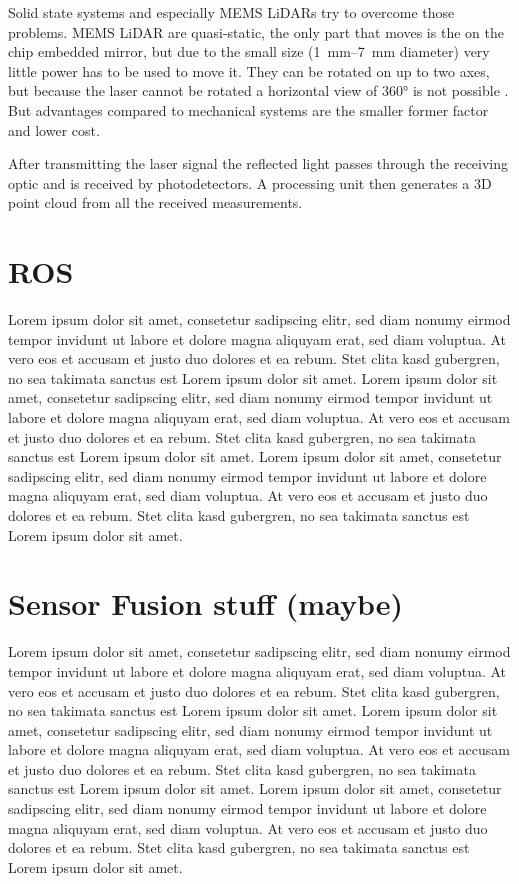 Solid state systems and especially MEMS LiDARs try to overcome those problems.
MEMS LiDAR are quasi-static, the only part that moves is the on the chip embedded mirror, but due to the small size (\SIrange{1}{7}{\milli\metre} diameter) very little power has to be used to move it.
They can be rotated on up to two axes, but because the laser cannot be rotated a horizontal view of 360° is not possible .
But advantages compared to mechanical systems are the smaller former factor and lower cost.

After transmitting the laser signal the reflected light passes through the receiving optic and is received by photodetectors.
A processing unit then generates a 3D point cloud from all the received measurements.

\cite{Wang2020}
\cite{Vaughan2006}

\section{ROS}
Lorem ipsum dolor sit amet, consetetur sadipscing elitr, sed diam nonumy eirmod tempor invidunt ut labore et dolore magna aliquyam erat, sed diam voluptua.
At vero eos et accusam et justo duo dolores et ea rebum. Stet clita kasd gubergren, no sea takimata sanctus est Lorem ipsum dolor sit amet.
Lorem ipsum dolor sit amet, consetetur sadipscing elitr, sed diam nonumy eirmod tempor invidunt ut labore et dolore magna aliquyam erat, sed diam voluptua.
At vero eos et accusam et justo duo dolores et ea rebum. Stet clita kasd gubergren, no sea takimata sanctus est Lorem ipsum dolor sit amet.
Lorem ipsum dolor sit amet, consetetur sadipscing elitr, sed diam nonumy eirmod tempor invidunt ut labore et dolore magna aliquyam erat, sed diam voluptua.
At vero eos et accusam et justo duo dolores et ea rebum. Stet clita kasd gubergren, no sea takimata sanctus est Lorem ipsum dolor sit amet.

\section{Sensor Fusion stuff (maybe)}
Lorem ipsum dolor sit amet, consetetur sadipscing elitr, sed diam nonumy eirmod tempor invidunt ut labore et dolore magna aliquyam erat, sed diam voluptua.
At vero eos et accusam et justo duo dolores et ea rebum. Stet clita kasd gubergren, no sea takimata sanctus est Lorem ipsum dolor sit amet.
Lorem ipsum dolor sit amet, consetetur sadipscing elitr, sed diam nonumy eirmod tempor invidunt ut labore et dolore magna aliquyam erat, sed diam voluptua.
At vero eos et accusam et justo duo dolores et ea rebum. Stet clita kasd gubergren, no sea takimata sanctus est Lorem ipsum dolor sit amet.
Lorem ipsum dolor sit amet, consetetur sadipscing elitr, sed diam nonumy eirmod tempor invidunt ut labore et dolore magna aliquyam erat, sed diam voluptua.
At vero eos et accusam et justo duo dolores et ea rebum. Stet clita kasd gubergren, no sea takimata sanctus est Lorem ipsum dolor sit amet.
